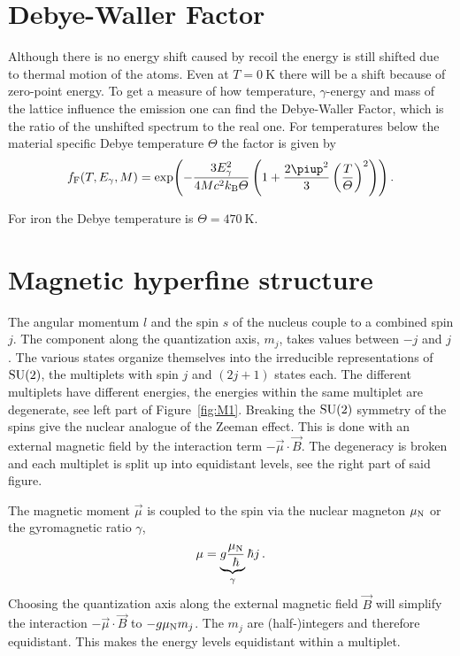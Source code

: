 \documentclass[11pt, english, fleqn, DIV=15, headinclude, BCOR=2cm]{scrreprt}
\begin{document}
\section{Debye-Waller Factor}

Although there is no energy shift caused by recoil the energy is still shifted
due to thermal motion of the atoms. Even at $T = \SI{0}{\kelvin}$ there will be
a shift because of zero-point energy. To get a measure of how temperature,
$\gamma$-energy and mass of the lattice influence the emission one can find
the Debye-Waller Factor, which is the ratio of the unshifted spectrum to the
real one. For temperatures below the material specific Debye temperature
$\Theta$ the factor is given by
\[
    f_\text{F} (T, E_\gamma, M) = \exp
    \!\del{-\frac{3E_\gamma^2}{4Mc^2k_\text{B}\Theta} \del{1 +
    \frac{2\piup^2}3 \del{\frac T\Theta}^2}}.
\]
\parencite[42]{Schatz/Nukleare_Festkoerperphysik}

For iron the Debye temperature is $\Theta = \SI{470}{\kelvin}$.
\parencite[Tabelle 6.1]{Hunklinger/Festkoerperphysik}

\section{Magnetic hyperfine structure}

The angular momentum $l$ and the spin $s$ of the nucleus couple to a combined
spin $j$. The component along the quantization axis, $m_j$, takes values
between $-j$ and $j$. The various states organize themselves into the
irreducible representations of $\mathrm{SU}(2)$, the multiplets with spin $j$ and
$(2j+1)$ states each. The different multiplets have different energies, the
energies within the same multiplet are degenerate, see left part of
Figure~\ref{fig:M1}. Breaking the $\mathrm{SU}(2)$ symmetry of the spins give the
nuclear analogue of the Zeeman effect. This is done with an external magnetic
field by the interaction term $- \vec\mu \cdot \vec B$. The degeneracy is
broken and each multiplet is split up into equidistant levels, see the right
part of said figure.

The magnetic moment $\vec \mu$ is coupled to the spin via the nuclear magneton
$\mu_\text N$ or the gyromagnetic ratio $\gamma$,
\[
    \mu = \underbrace{g \frac{\mu_\text N}{\hbar}}_{\gamma} \hbar j \,.
\]
Choosing the quantization axis along the external magnetic field $\vec B$ will
simplify the interaction $- \vec \mu \cdot \vec B$ to $- g \mu_\text N m_j$.
The $m_j$ are (half-)integers and therefore equidistant. This makes the energy
levels equidistant within a multiplet.
\end{document}

